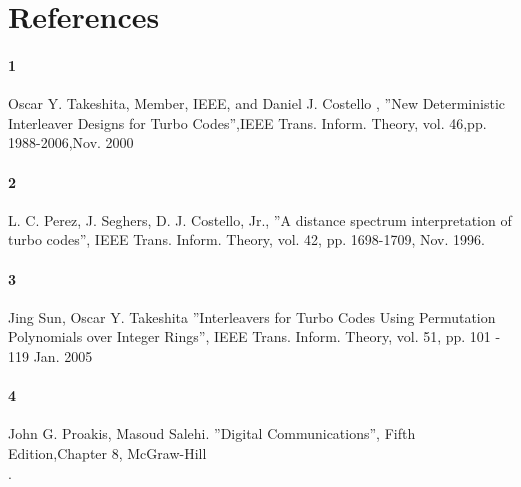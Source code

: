 \documentclass[20 pts]{article}
\begin{document}


    
\section{References}
\paragraph{1}  Oscar Y. Takeshita, Member, IEEE, and Daniel J. Costello ,
''New Deterministic Interleaver Designs for Turbo Codes'',IEEE Trans. Inform. Theory,
 vol. 46,pp. 1988-2006,Nov. 2000\\
  \paragraph{2} L. C. Perez, J. Seghers, D. J. Costello, Jr., 
  ''A distance spectrum interpretation of turbo codes'', IEEE Trans. Inform. Theory,
   vol. 42, pp. 1698-1709, Nov. 1996.\\
\paragraph{3} Jing Sun, Oscar Y. Takeshita ”Interleavers for Turbo Codes Using 
Permutation Polynomials over Integer Rings”, IEEE Trans. Inform. Theory, vol. 51,
pp. 101 - 119 Jan. 2005\\
\paragraph{4} John G. Proakis, Masoud Salehi. ''Digital Communications'', 
Fifth Edition,Chapter 8, McGraw-Hill\\.
\end{document}
